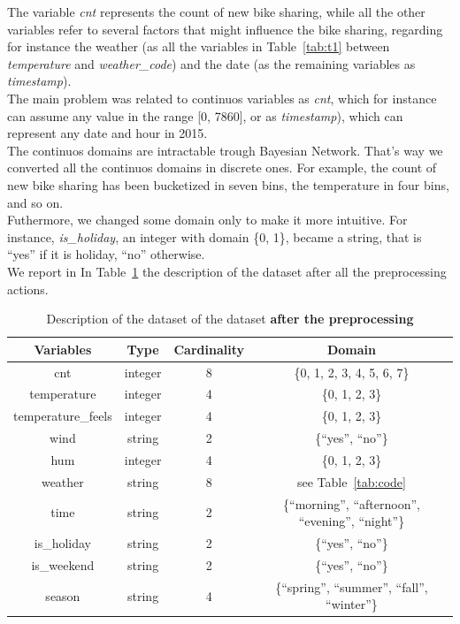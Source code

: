 \documentclass[letterpaper,11pt]{article}
\begin{document}
The variable \textit{cnt} represents the count of new bike sharing, while all the other 
variables refer to several factors that might influence the bike sharing, regarding
for instance the weather (as all the variables in Table~\ref{tab:t1} between \textit{temperature}
and \textit{weather\_code}) and the date (as the remaining variables as \textit{timestamp}).\\
The main problem was related to continuos variables as \textit{cnt}, which for instance
can assume any value in the range [0, 7860], or as \textit{timestamp}), which can represent
any date and hour in 2015. \\ The continuos domains are intractable trough Bayesian Network. That's way 
we converted all the continuos domains in discrete ones. For example, the count of new bike sharing
has been bucketized in seven bins, the temperature in four bins, and so on. \\ Futhermore, we changed 
some domain only to make it more intuitive. For instance, \textit{is\_holiday}, an integer with domain \{0, 1\}, 
became a string, that is ``yes'' if it is holiday, ``no'' otherwise.\\ We report in 
In Table~\ref{tab:t2} the description of the dataset after all the preprocessing actions.

\begin{table}[h]
\begin{center}
\label{table2} 
\begin{tabular}{cccc} 
\hline
\multicolumn{1}{c}{Variables} & \multicolumn{1}{c}{Type} & \multicolumn{1}{c}{Cardinality}& \multicolumn{1}{c}{Domain }\\
\hline
cnt &   integer & 8 & \{0, 1, 2, 3, 4, 5, 6, 7\} \\
temperature &   integer & 4 & \{0, 1, 2, 3\}\\
temperature\_feels & integer & 4   & \{0, 1, 2, 3\}\\
wind & string & 2 & \{``yes'', ``no''\}\\
hum & integer & 4 & \{0, 1, 2, 3\}\\
weather & string & 8 & see Table~\ref{tab:code}\\
time & string & 2 & \{``morning'', ``afternoon'', ``evening'', ``night''\} \\
is\_holiday  & string &2 &  \{``yes'', ``no''\}\\
is\_weekend  & string &2 &  \{``yes'', ``no''\}\\
season & string & 4 & \{``spring'', ``summer'', ``fall'', ``winter''\}\\
\hline
\end{tabular}
\caption{Description of the dataset of the dataset \textbf{after the preprocessing}}
\label{tab:t2} 
\end{center}
\end{table}
\end{document}
